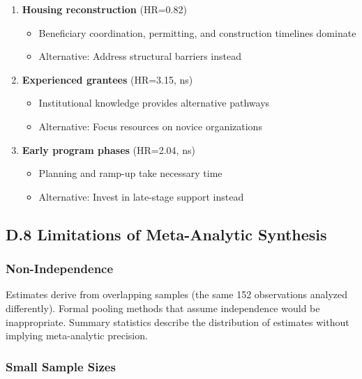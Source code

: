 \documentclass[
  12pt,
  letterpaper,
]{article}
\providecommand{\tightlist}{%
  \setlength{\itemsep}{0pt}\setlength{\parskip}{0pt}}
\begin{document}
\begin{enumerate}
\def\labelenumi{\arabic{enumi}.}
\tightlist
\item
  \textbf{Housing reconstruction} (HR=0.82)

  \begin{itemize}
  \tightlist
  \item
    Beneficiary coordination, permitting, and construction timelines
    dominate
  \item
    Alternative: Address structural barriers instead
  \end{itemize}
\item
  \textbf{Experienced grantees} (HR=3.15, ns)

  \begin{itemize}
  \tightlist
  \item
    Institutional knowledge provides alternative pathways
  \item
    Alternative: Focus resources on novice organizations
  \end{itemize}
\item
  \textbf{Early program phases} (HR=2.04, ns)

  \begin{itemize}
  \tightlist
  \item
    Planning and ramp-up take necessary time
  \item
    Alternative: Invest in late-stage support instead
  \end{itemize}
\end{enumerate}

\subsection{D.8 Limitations of Meta-Analytic
Synthesis}\label{d.8-limitations-of-meta-analytic-synthesis}

\subsubsection{Non-Independence}\label{non-independence}

Estimates derive from overlapping samples (the same 152 observations
analyzed differently). Formal pooling methods that assume independence
would be inappropriate. Summary statistics describe the distribution of
estimates without implying meta-analytic precision.

\subsubsection{Small Sample Sizes}\label{small-sample-sizes}
\end{document}

